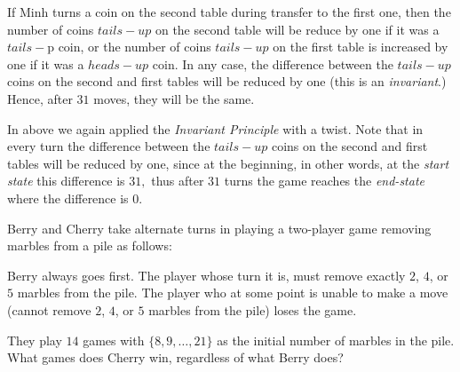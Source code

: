 \documentclass{article}
\begin{document}
\begin{soln}
    If Minh turns a coin on the second table during transfer to the first one,
    then the number of coins $tails-up$ on the second table will be reduce by one if it was a $tails-$p coin,
    or the number of coins $tails-up$ on the first table is increased by one if it was a $heads-up$ coin.
    In any case, the difference between the $tails-up$ coins on the second and first tables will be reduced by one
    (this is an \textit{invariant}.) Hence, after $31$ moves, they will be the same.

    In above we again applied the \textit{Invariant Principle} with a twist.
    Note that in every turn the difference between the $tails-up$ coins on the second and first tables will be reduced by one,
    since at the beginning, in other words, at the \textit{start state} this difference is $31,$
    thus after $31$ turns the game reaches the \textit{end-state} where the difference is $0.$
\end{soln}

\begin{example*}

    Berry and Cherry take alternate turns in playing a two-player game removing marbles from a pile as follows:
    \begin{itemize}[topsep=0pt, partopsep=0pt, itemsep=0pt]
        \ii Berry always goes first.
        \ii The player whose turn it is, must remove exactly $2$, $4$, or $5$ marbles from the pile.
        \ii The player who at some point is unable to make a move (cannot remove $2$, $4$, or $5$ marbles from the pile) loses the game.
    \end{itemize}
    They play $14$ games with $\{8, 9, \ldots, 21\}$ as the initial number of marbles in the pile.
    What games does Cherry win, regardless of what Berry does?
\end{example*}
\end{document}
